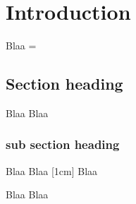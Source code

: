 \chapter{Introduction} 

Blaa
\be
{} = 
\ee

\section{Section heading}
Blaa
Blaa

\subsection{sub section heading}
Blaa
Blaa
[1cm]
Blaa


Blaa
Blaa

